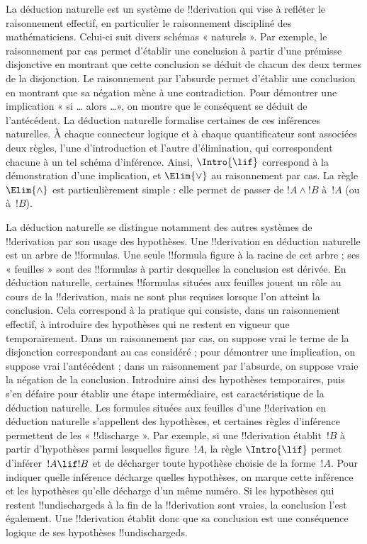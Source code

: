 \documentclass[../../../include/open-logic-section]{subfiles}
\begin{document}
      {}
      {}


La déduction naturelle est un système de !!{derivation} qui vise à
refléter le raisonnement effectif, en particulier le raisonnement
discipliné des mathématiciens. Celui-ci suit divers schémas « naturels ».
Par exemple, le raisonnement par cas permet d'établir une conclusion à
partir d'une prémisse disjonctive en montrant que cette conclusion se
déduit de chacun des deux termes de la disjonction. Le raisonnement par
l'absurde permet d'établir une conclusion en montrant que sa négation
mène à une contradiction. Pour démontrer une implication « si \dots
alors \dots », on montre que le conséquent se déduit de l'antécédent.
La déduction naturelle formalise certaines de ces inférences naturelles.
À chaque connecteur logique et à chaque quantificateur sont associées
deux règles, l'une d'introduction et l'autre d'élimination, qui
correspondent chacune à un tel schéma d'inférence. Ainsi,
$\Intro{\lif}$ correspond à la démonstration d'une implication, et
$\Elim{\lor}$ au raisonnement par cas. La règle $\Elim{\land}$ est
particulièrement simple : elle permet de passer de $!A \land !B$ à~$!A$
(ou à~$!B$).

La déduction naturelle se distingue notamment des autres systèmes de
!!{derivation} par son usage des hypothèses. Une !!{derivation} en
déduction naturelle est un arbre de !!{formula}s. Une seule !!{formula}
figure à la racine de cet arbre ; ses « feuilles » sont des !!{formula}s
à partir desquelles la conclusion est dérivée. En déduction naturelle,
certaines !!{formula}s situées aux feuilles jouent un rôle au cours de la
!!{derivation}, mais ne sont plus requises lorsque l'on atteint la
conclusion. Cela correspond à la pratique qui consiste, dans un
raisonnement effectif, à introduire des hypothèses qui ne restent en
vigueur que temporairement. Dans un raisonnement par cas, on suppose
vrai le terme de la disjonction correspondant au cas considéré ;
pour démontrer une implication, on suppose vrai l'antécédent ; dans un
raisonnement par l'absurde, on suppose vraie la négation de la conclusion.
Introduire ainsi des hypothèses temporaires, puis s'en défaire pour
établir une étape intermédiaire, est caractéristique de la déduction
naturelle. Les formules situées aux feuilles d'une !!{derivation} en
déduction naturelle s'appellent des hypothèses, et certaines règles
d'inférence permettent de les « !!{discharge} ». Par exemple, si une
!!{derivation} établit~$!B$ à partir d'hypothèses parmi lesquelles
figure~$!A$, la règle $\Intro{\lif}$ permet d'inférer~$!A \lif !B$ et
de décharger toute hypothèse choisie de la forme~$!A$. Pour indiquer quelle
inférence décharge quelles hypothèses, on marque cette inférence et
les hypothèses qu'elle décharge d'un même numéro. Si les hypothèses qui
restent !!{undischarged}s à la fin de la !!{derivation} sont vraies, la
conclusion l'est également. Une !!{derivation} établit donc que sa
conclusion est une conséquence logique de ses hypothèses
!!{undischarged}s.
\end{document}
